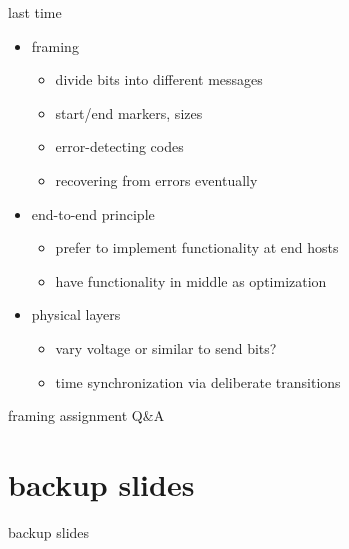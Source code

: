 \date{}
\title{}
\date{}
\usepackage{pgfplots}
\pgfplotsset{compat=1.16}

\begin{frame}
    \titlepage
\end{frame}

\begin{frame}{last time}
    \begin{itemize}
    \item framing
        \begin{itemize}
        \item divide bits into different messages
        \item start/end markers, sizes
        \item error-detecting codes
        \item recovering from errors eventually
        \end{itemize}
    \item end-to-end principle
        \begin{itemize}
        \item prefer to implement functionality at end hosts
        \item have functionality in middle as optimization
        \end{itemize}
    \item physical layers
        \begin{itemize}
        \item vary voltage or similar to send bits?
        \item time synchronization via deliberate transitions
        \end{itemize}
    \end{itemize}
\end{frame}

\begin{frame}{}
\end{frame}

\begin{frame}{framing assignment Q\&A}
\end{frame}



\section{backup slides}
\begin{frame}{backup slides}
\end{frame}


